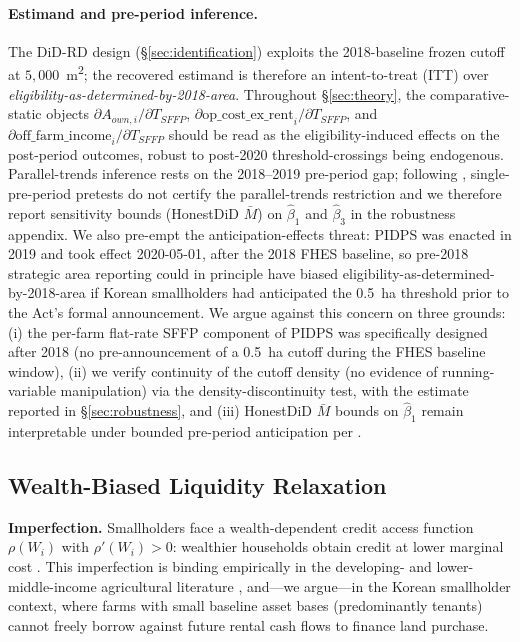 \documentclass[12pt, a4paper]{article}
\begin{document}
\paragraph{Estimand and pre-period inference.} The DiD-RD design (\S\ref{sec:identification}) exploits the 2018-baseline frozen cutoff at $5{,}000$~m\textsuperscript{2}; the recovered estimand is therefore an intent-to-treat (ITT) over \textit{eligibility-as-determined-by-2018-area}. Throughout \S\ref{sec:theory}, the comparative-static objects $\partial A_{own,i}/\partial T_{SFFP}$, $\partial \text{op\_cost\_ex\_rent}_i/\partial T_{SFFP}$, and $\partial \text{off\_farm\_income}_i/\partial T_{SFFP}$ should be read as the eligibility-induced effects on the post-period outcomes, robust to post-2020 threshold-crossings being endogenous. Parallel-trends inference rests on the 2018--2019 pre-period gap; following \citet{Roth2022_pretrends}, single-pre-period pretests do not certify the parallel-trends restriction and we therefore report \citet{RambachanRoth2023_honestdid} sensitivity bounds (HonestDiD $\bar M$) on $\hat\beta_1$ and $\hat\beta_3$ in the robustness appendix. We also pre-empt the anticipation-effects threat: PIDPS was enacted in 2019 and took effect 2020-05-01, after the 2018 FHES baseline, so pre-2018 strategic area reporting could in principle have biased eligibility-as-determined-by-2018-area if Korean smallholders had anticipated the 0.5~ha threshold prior to the Act's formal announcement. We argue against this concern on three grounds: (i) the per-farm flat-rate SFFP component of PIDPS was specifically designed after 2018 (no pre-announcement of a 0.5~ha cutoff during the FHES baseline window), (ii) we verify continuity of the cutoff density (no evidence of running-variable manipulation) via the \citet{McCrary2008_density} density-discontinuity test, with the estimate reported in \S\ref{sec:robustness}, and (iii) HonestDiD $\bar M$ bounds on $\hat\beta_1$ remain interpretable under bounded pre-period anticipation per \citet{RambachanRoth2023_honestdid}.

\subsection{Wealth-Biased Liquidity Relaxation}
\label{sec:liquidity}

\textbf{Imperfection.} Smallholders face a wealth-dependent credit access function $\rho(W_i)$ with $\rho'(W_i) > 0$: wealthier households obtain credit at lower marginal cost \citep{CarterOlinto2003_liquidity}. This imperfection is binding empirically in the developing- and lower-middle-income agricultural literature \citep{PittKhandker1998_credit, FosterRosenzweig1995_learning}, and---we argue---in the Korean smallholder context, where farms with small baseline asset bases (predominantly tenants) cannot freely borrow against future rental cash flows to finance land purchase.
\end{document}
